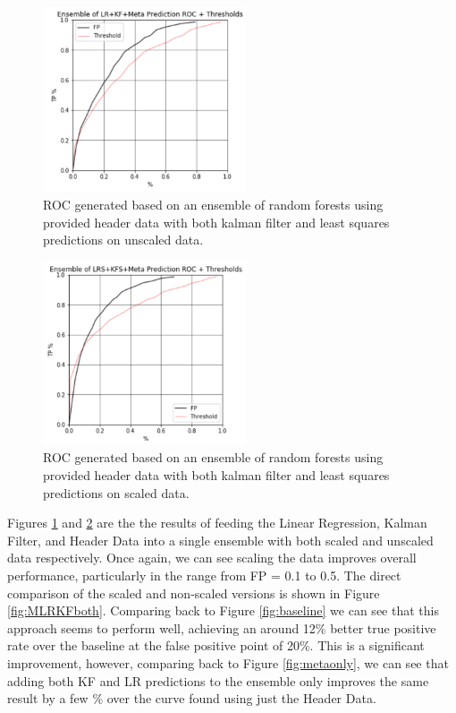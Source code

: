 \begin{figure}[h]
\centering
\includegraphics[width=6cm]{body/results/META_LR_KF.png}
\caption{ROC generated based on an ensemble of random forests using provided header data with both kalman filter and least squares predictions on unscaled data.}
\label{fig:MLRKF}
\end{figure}

\begin{figure}[h]
\centering
\includegraphics[width=6cm]{body/results/META_LR_KFs.png}
\caption{ROC generated based on an ensemble of random forests using provided header data with both kalman filter and least squares predictions on scaled data.}
\label{fig:MLRKFs}
\end{figure}

Figures \ref{fig:MLRKF} and \ref{fig:MLRKFs} are the the results of feeding the Linear Regression, Kalman Filter, and Header Data into a single ensemble with both scaled and unscaled data respectively. Once again, we can see scaling the data improves overall performance, particularly in the range from FP = 0.1 to 0.5. The direct comparison of the scaled and non-scaled versions is shown in Figure \ref{fig:MLRKFboth}. Comparing back to Figure \ref{fig:baseline} we can see that this approach seems to perform well, achieving an around 12\% better true positive rate over the baseline at the false positive point of 20\%. This is a significant improvement, however, comparing back to Figure \ref{fig:metaonly}, we can see that adding both KF and LR predictions to the ensemble only improves the same result by a few \% over the curve found using just the Header Data.

